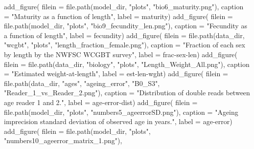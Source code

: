 \documentclass[
  letterpaper,
]{article}
\newenvironment{Shaded}{\begin{snugshade}}{\end{snugshade}}
\newcommand{\AttributeTok}[1]{\textcolor[rgb]{0.77,0.63,0.00}{#1}}
\newcommand{\FunctionTok}[1]{\textcolor[rgb]{0.00,0.00,0.00}{#1}}
\newcommand{\NormalTok}[1]{#1}
\newcommand{\StringTok}[1]{\textcolor[rgb]{0.31,0.60,0.02}{#1}}
\begin{document}
\begin{Shaded}
\begin{Highlighting}[]
\FunctionTok{add\_figure}\NormalTok{(}
\AttributeTok{filein =} \FunctionTok{file.path}\NormalTok{(model\_dir, }\StringTok{"plots"}\NormalTok{, }\StringTok{"bio6\_maturity.png"}\NormalTok{), }
\AttributeTok{caption =} \StringTok{"Maturity as a function of length"}\NormalTok{,}
\AttributeTok{label =} \StringTok{\textquotesingle{}maturity\textquotesingle{}}\NormalTok{)}
\FunctionTok{add\_figure}\NormalTok{(}
\AttributeTok{filein =} \FunctionTok{file.path}\NormalTok{(model\_dir, }\StringTok{"plots"}\NormalTok{, }\StringTok{"bio9\_fecundity\_len.png"}\NormalTok{), }
\AttributeTok{caption =} \StringTok{"Fecundity as a function of length"}\NormalTok{,}
\AttributeTok{label =} \StringTok{\textquotesingle{}fecundity\textquotesingle{}}\NormalTok{)}
\FunctionTok{add\_figure}\NormalTok{(}
\AttributeTok{filein =} \FunctionTok{file.path}\NormalTok{(data\_dir, }\StringTok{"wcgbt"}\NormalTok{, }\StringTok{"plots"}\NormalTok{, }\StringTok{"length\_fraction\_female.png"}\NormalTok{), }
\AttributeTok{caption =} \StringTok{"Fraction of each sex by length by the NWFSC WCGBT survey"}\NormalTok{,}
\AttributeTok{label =} \StringTok{\textquotesingle{}frac{-}sex{-}len\textquotesingle{}}\NormalTok{)}
\FunctionTok{add\_figure}\NormalTok{(}
\AttributeTok{filein =} \FunctionTok{file.path}\NormalTok{(data\_dir, }\StringTok{"biology"}\NormalTok{, }\StringTok{"plots"}\NormalTok{, }\StringTok{"Length\_Weight\_All.png"}\NormalTok{), }
\AttributeTok{caption =} \StringTok{"Estimated weight{-}at{-}length"}\NormalTok{,}
\AttributeTok{label =} \StringTok{\textquotesingle{}est{-}len{-}wght\textquotesingle{}}\NormalTok{)}
\FunctionTok{add\_figure}\NormalTok{(}
\AttributeTok{filein =} \FunctionTok{file.path}\NormalTok{(data\_dir, }\StringTok{"ages"}\NormalTok{, }\StringTok{"ageing\_error"}\NormalTok{, }\StringTok{"B0\_S3"}\NormalTok{, }\StringTok{"Reader\_1\_vs\_Reader\_2.png"}\NormalTok{), }
\AttributeTok{caption =} \StringTok{"Distribution of double reads between age reader 1 and 2."}\NormalTok{,}
\AttributeTok{label =} \StringTok{\textquotesingle{}age{-}error{-}dist\textquotesingle{}}\NormalTok{)}
\FunctionTok{add\_figure}\NormalTok{(}
\AttributeTok{filein =} \FunctionTok{file.path}\NormalTok{(model\_dir, }\StringTok{"plots"}\NormalTok{,  }\StringTok{"numbers5\_ageerrorSD.png"}\NormalTok{), }
\AttributeTok{caption =} \StringTok{"Ageing imprecision standard deviation of observed age in years."}\NormalTok{,}
\AttributeTok{label =} \StringTok{\textquotesingle{}age{-}error\textquotesingle{}}\NormalTok{)}
\FunctionTok{add\_figure}\NormalTok{(}
\AttributeTok{filein =} \FunctionTok{file.path}\NormalTok{(model\_dir, }\StringTok{"plots"}\NormalTok{,  }\StringTok{"numbers10\_ageerror\_matrix\_1.png"}\NormalTok{), }

\end{Highlighting}
\end{Shaded}
\end{document}

